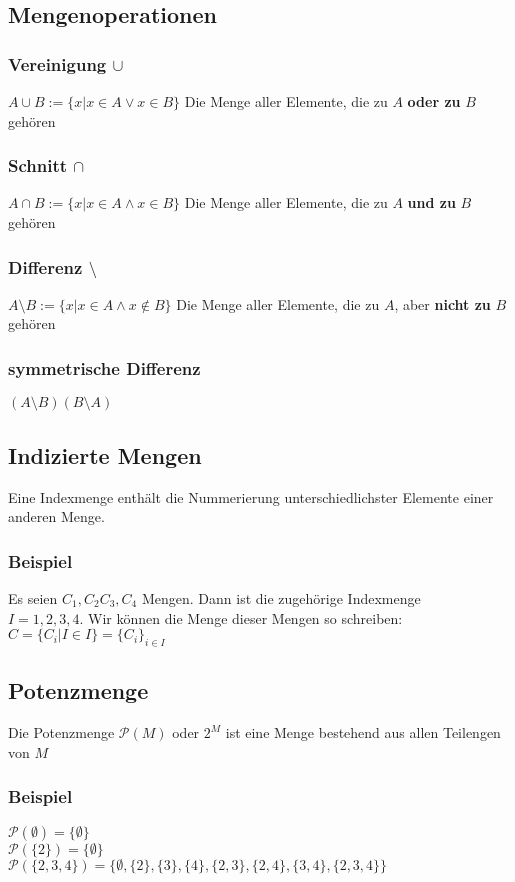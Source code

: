 \subsection{Mengenoperationen}
\subsubsection{Vereinigung $\cup$}
$A\cup B:=\{x|x\in A\vee x\in B\}$ \hspace{2cm} Die Menge aller Elemente, die zu $A$ {\bf oder zu} $B$ gehören
\subsubsection{Schnitt $\cap$}
$A\cap B:=\{x|x\in A\wedge x\in B\}$ \hspace{2cm} Die Menge aller Elemente, die zu $A$ {\bf und zu} $B$ gehören
\subsubsection{Differenz $\setminus$}
$A\setminus  B:=\{x|x\in A\wedge x\notin B\}$ \hspace{2cm} Die Menge aller Elemente, die zu $A$, aber {\bf nicht zu} $B$ gehören
\subsubsection{symmetrische Differenz}
$(A\setminus B)(B\setminus A)$

\subsection{Indizierte Mengen}
Eine Indexmenge enthält die Nummerierung unterschiedlichster Elemente einer anderen Menge.
\subsubsection{Beispiel}
Es seien $C_1,C_2 C_3,C_4$ Mengen. Dann ist die zugehörige Indexmenge\\
$I={1,2,3,4}$. Wir können die Menge dieser Mengen so schreiben: \\
$C=\{C_i|I\in I\}=\{C_i \}_{i\in I }$

\subsection{Potenzmenge}
Die Potenzmenge $\mathcal{P}(M)$ oder $2^M$ ist eine Menge bestehend aus allen Teilengen von $M$
\subsubsection{Beispiel}
$\mathcal{P}(\emptyset)=\{\emptyset \}$\\
$\mathcal{P}(\{2\})=\{\emptyset \}$\\
$\mathcal{P}(\{2,3,4\})=\{\emptyset, \{2\}, \{3\}, \{4\}, \{2,3\}, \{2,4\}, \{3,4\}, \{2,3,4\}\}$

